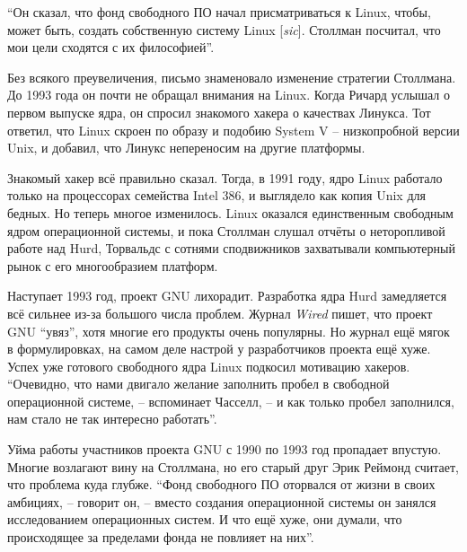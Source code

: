 ``Он сказал, что фонд свободного ПО начал присматриваться к Linux, чтобы, может быть, создать собственную систему Linux [\textit{sic}]. Столлман посчитал, что мои цели сходятся с их философией''.

Без всякого преувеличения, письмо знаменовало изменение стратегии Столлмана. До 1993 года он почти не обращал внимания на Linux. Когда Ричард услышал о первом выпуске ядра, он спросил знакомого хакера о качествах Линукса. Тот ответил, что Linux скроен по образу и подобию System V -- низкопробной версии Unix, и добавил, что Линукс непереносим на другие платформы.

Знакомый хакер всё правильно сказал. Тогда, в 1991 году, ядро Linux работало только на процессорах семейства Intel 386, и выглядело как копия Unix для бедных. Но теперь многое изменилось. Linux оказался единственным свободным ядром операционной системы, и пока Столлман слушал отчёты о неторопливой работе над Hurd, Торвальдс с сотнями сподвижников захватывали компьютерный рынок с его многообразием платформ.

Наступает 1993 год, проект GNU лихорадит. Разработка ядра Hurd замедляется всё сильнее из-за большого числа проблем. Журнал \textit{Wired} пишет, что проект GNU ``увяз'', хотя многие его продукты очень популярны.  Но журнал ещё мягок в формулировках, на самом деле настрой у разработчиков проекта ещё хуже. Успех уже готового свободного ядра Linux подкосил мотивацию хакеров. ``Очевидно, что нами двигало желание заполнить пробел в свободной операционной системе, -- вспоминает Часселл, -- и как только пробел заполнился, нам стало не так интересно работать''. 

Уйма работы участников проекта GNU с 1990 по 1993 год пропадает впустую. Многие возлагают вину на Столлмана, но его старый друг Эрик Реймонд считает, что проблема куда глубже. ``Фонд свободного ПО оторвался от жизни в своих амбициях, -- говорит он, -- вместо создания операционной системы он занялся исследованием операционных систем. И что ещё хуже, они думали, что происходящее за пределами фонда не повлияет на них''.

